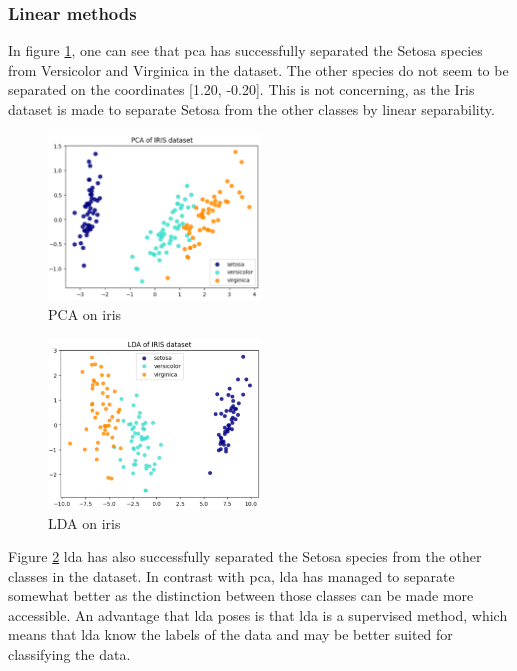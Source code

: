 \subsubsection{Linear methods}\label{subsubsec:linear-methods-on-iris}
In figure \ref{fig:iris-pca}, one can see that \gls{pca} has successfully separated the Setosa species from Versicolor and Virginica in the dataset. The other species do not seem to be separated on the coordinates [1.20, -0.20]. This is not concerning, as the Iris dataset is made to separate Setosa from the other classes by linear separability. 

\begin{figure}[htb!]
\centering
\includegraphics[width=0.5\textwidth]{figures/theory-example-figures/iris-pca.png}
\caption{PCA on iris}
\label{fig:iris-pca}
\end{figure}


\begin{figure}[htb!]
    \centering
    \includegraphics[width=0.5\textwidth]{figures/theory-example-figures/iris-lda.png}
    \caption{LDA on iris}
    \label{fig:iris-lda}
    \end{figure}
    
Figure \ref{fig:iris-lda} \gls{lda} has also successfully separated the Setosa species from the other classes in the dataset. In contrast with \gls{pca}, \gls{lda} has managed to separate somewhat better as the distinction between those classes can be made more accessible. An advantage that \gls{lda} poses is that \gls{lda} is a supervised method, which means that  \gls{lda} know the labels of the data and may be better suited for classifying the data.

